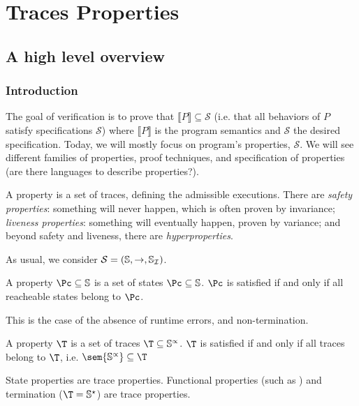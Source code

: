 \documentclass[toc, titlepaged]{../cs-classes/cs-classes}
\begin{document}
\begin{definition}
    
\end{definition}

\newcommand*{\Sc}{\mathcal{S}}
\section{Traces Properties}
\subsection{A high level overview}
\subsubsection{Introduction}
The goal of verification is to prove that $\llbracket P \rrbracket\subseteq \Sc$ (i.e. that all behaviors of $P$ satisfy specifications $\Sc$) where $\llbracket P\rrbracket$ is the program semantics and $\Sc$ the desired specification. Today, we will mostly focus on program's properties, $\Sc$. We will see different families of properties, proof techniques, and specification of properties (are there languages to describe properties?).

A property is a set of traces, defining the admissible executions. There are \emph{safety properties}: something will never happen, which is often proven by invariance; \emph{liveness properties}: something will eventually happen, proven by variance; and beyond safety and liveness, there are \emph{hyperproperties}.

As usual, we consider $\Sc = (\S, \to, \S_{\mathcal{I}})$.
\begin{definition}
    A property $\Pc\subseteq\S$ is a set of states $\Pc\subseteq\S$. $\Pc$ is satisfied if and only if all reacheable states belong to $\Pc$.
\end{definition}
This is the case of the absence of runtime errors, and non-termination.

\begin{definition}
    A property $\T$ is a set of traces $\T \subseteq \S^\propto$. $\T$ is satisfied if and only if all traces belong to $\T$, i.e. $\sem{\S^\propto} \subseteq \T$
\end{definition}
State properties are trace properties. Functional properties (such as ) and termination ($\T=\S^\star$) are trace properties.
\end{document}
